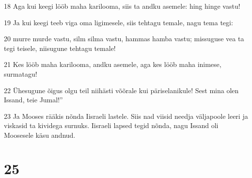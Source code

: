 \par 18 Aga kui keegi lööb maha karilooma, siis ta andku asemele: hing hinge vastu!
\par 19 Ja kui keegi teeb viga oma ligimesele, siis tehtagu temale, nagu tema tegi:
\par 20 murre murde vastu, silm silma vastu, hammas hamba vastu; missuguse vea ta tegi teisele, niisugune tehtagu temale!
\par 21 Kes lööb maha karilooma, andku asemele, aga kes lööb maha inimese, surmatagu!
\par 22 Ühesugune õigus olgu teil niihästi võõrale kui päriselanikule! Sest mina olen Issand, teie Jumal!”
\par 23 Ja Mooses rääkis nõnda Iisraeli lastele. Siis nad viisid needja väljapoole leeri ja viskasid ta kividega surnuks. Iisraeli lapsed tegid nõnda, nagu Issand oli Moosesele käsu andnud.

\chapter{25}

